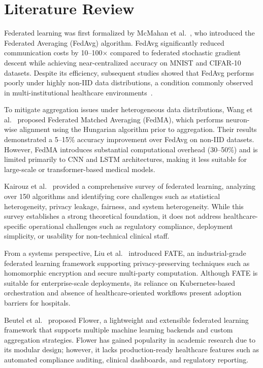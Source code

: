 \section{Literature Review}

Federated learning was first formalized by McMahan et al.~\cite{McMahan2017}, who introduced the Federated Averaging (FedAvg) algorithm. FedAvg significantly reduced communication costs by 10--100$\times$ compared to federated stochastic gradient descent while achieving near-centralized accuracy on MNIST and CIFAR-10 datasets. Despite its efficiency, subsequent studies showed that FedAvg performs poorly under highly non-IID data distributions, a condition commonly observed in multi-institutional healthcare environments~\cite{Zhao2018,Li2020}.

To mitigate aggregation issues under heterogeneous data distributions, Wang et al.~\cite{Wang2020} proposed Federated Matched Averaging (FedMA), which performs neuron-wise alignment using the Hungarian algorithm prior to aggregation. Their results demonstrated a 5--15\% accuracy improvement over FedAvg on non-IID datasets. However, FedMA introduces substantial computational overhead (30--50\%) and is limited primarily to CNN and LSTM architectures, making it less suitable for large-scale or transformer-based medical models.

Kairouz et al.~\cite{Kairouz2021} provided a comprehensive survey of federated learning, analyzing over 150 algorithms and identifying core challenges such as statistical heterogeneity, privacy leakage, fairness, and system heterogeneity. While this survey establishes a strong theoretical foundation, it does not address healthcare-specific operational challenges such as regulatory compliance, deployment simplicity, or usability for non-technical clinical staff.

From a systems perspective, Liu et al.~\cite{Liu2021} introduced FATE, an industrial-grade federated learning framework supporting privacy-preserving techniques such as homomorphic encryption and secure multi-party computation. Although FATE is suitable for enterprise-scale deployments, its reliance on Kubernetes-based orchestration and absence of healthcare-oriented workflows present adoption barriers for hospitals.

Beutel et al.~\cite{Beutel2020} proposed Flower, a lightweight and extensible federated learning framework that supports multiple machine learning backends and custom aggregation strategies. Flower has gained popularity in academic research due to its modular design; however, it lacks production-ready healthcare features such as automated compliance auditing, clinical dashboards, and regulatory reporting.

